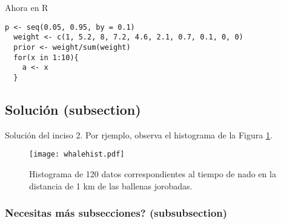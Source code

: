 \documentclass[paper=letter, fontsize=11pt]{scrartcl}
\numberwithin{equation}{section} %
\numberwithin{figure}{section} %
\numberwithin{table}{section} %
\begin{document}
Ahora en R
\begin{lstlisting}[style=customc,basicstyle=\scriptsize]
  p <- seq(0.05, 0.95, by = 0.1)
  weight <- c(1, 5.2, 8, 7.2, 4.6, 2.1, 0.7, 0.1, 0, 0)
  prior <- weight/sum(weight)
  for(x in 1:10){
    a <- x
  }
\end{lstlisting}  
\subsection{Soluci\'on (subsection)}

Soluci\'on del inciso 2. Por rjemplo, observa el histograma de la Figura \ref{fig:hist1}.
\begin{figure}[htpb]
  \begin{center}
    \texttt{[image: whalehist.pdf]}
    \caption{Histograma de 120 datos correspondientes al tiempo
      de nado en la distancia de 1 km de las ballenas jorobadas.}
    \label{fig:hist1}
  \end{center}
\end{figure}

\subsubsection{Necesitas m\'as subsecciones? (subsubsection)}
\end{document}
